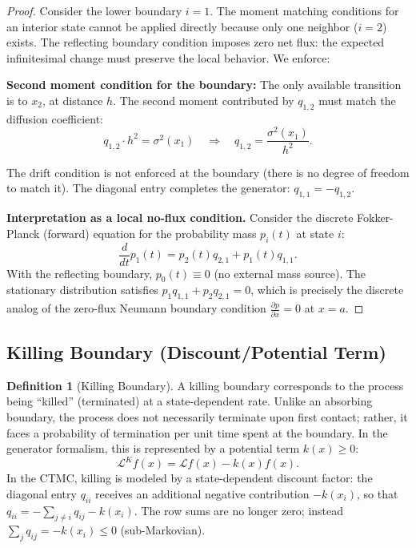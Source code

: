 \documentclass[11pt,a4paper,openany]{book}
\theoremstyle{definition}
\newtheorem{definition}{Definition}[chapter]
\theoremstyle{plain}
\theoremstyle{remark}
\newcommand{\1}{\mathbbm{1}}
\begin{document}
\begin{proof}
Consider the lower boundary $i=1$. The moment matching conditions for an interior state cannot be applied directly because only one neighbor ($i=2$) exists. The reflecting boundary condition imposes zero net flux: the expected infinitesimal change must preserve the local behavior. We enforce:

\textbf{Second moment condition for the boundary:} The only available transition is to $x_{2}$, at distance $h$. The second moment contributed by $q_{1,2}$ must match the diffusion coefficient:
\[
q_{1,2} \cdot h^{2} = \sigma^{2}(x_{1}) \quad \Longrightarrow \quad q_{1,2} = \frac{\sigma^{2}(x_{1})}{h^{2}}.
\]

The drift condition is not enforced at the boundary (there is no degree of freedom to match it). The diagonal entry completes the generator: $q_{1,1} = -q_{1,2}$.

\textbf{Interpretation as a local no-flux condition.} Consider the discrete Fokker-Planck (forward) equation for the probability mass $p_{i}(t)$ at state $i$:
\[
\frac{d}{dt} p_{1}(t) = p_{2}(t) q_{2,1} + p_{1}(t) q_{1,1}.
\]
With the reflecting boundary, $p_{0}(t) \equiv 0$ (no external mass source). The stationary distribution satisfies $p_{1} q_{1,1} + p_{2} q_{2,1} = 0$, which is precisely the discrete analog of the zero-flux Neumann boundary condition $\frac{\partial p}{\partial x} = 0$ at $x = a$.
\end{proof}

\subsection{Killing Boundary (Discount/Potential Term)}

\begin{definition}[Killing Boundary]
A killing boundary corresponds to the process being ``killed'' (terminated) at a state-dependent rate. Unlike an absorbing boundary, the process does not necessarily terminate upon first contact; rather, it faces a probability of termination per unit time spent at the boundary. In the generator formalism, this is represented by a potential term $k(x) \geq 0$:
\[
\mathcal{L}^{K} f(x) = \mathcal{L} f(x) - k(x) f(x).
\]
In the CTMC, killing is modeled by a state-dependent discount factor: the diagonal entry $q_{ii}$ receives an additional negative contribution $-k(x_{i})$, so that $q_{ii} = -\sum_{j \neq i} q_{ij} - k(x_{i})$. The row sums are no longer zero; instead $\sum_{j} q_{ij} = -k(x_{i}) \leq 0$ (sub-Markovian).
\end{definition}
\end{document}
